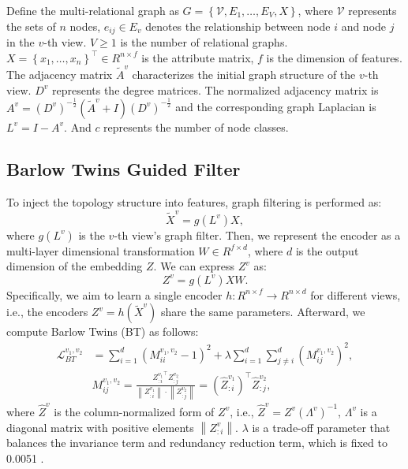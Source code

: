 \documentclass[letterpaper]{article} %
\begin{document}
Define the multi-relational graph as $G=\left\{\mathcal{V}, E_1, \ldots, E_{V}, X\right\}$, where $\mathcal{V}$ represents the sets of $n$ nodes, $e_{i j} \in E_v$ denotes the relationship between node $i$ and node $j$ in the $v$-th view. ${V} \geq 1$ is the number of relational graphs. $X=\left\{x_1, \ldots, x_n\right\}^{\top} \in {R}^{n \times f}$ is the attribute matrix, $f$ is the dimension of features. The adjacency matrix $\widetilde{A}^v$ characterizes the initial graph structure of the $v$-th view. $D^v$ represents the degree matrices. The normalized adjacency matrix is $A^v=\left(D^v\right)^{-\frac{1}{2}}\left(\widetilde{A}^v+I\right)\left(D^v\right)^{-\frac{1}{2}}$ and the corresponding graph Laplacian is $L^v=I-A^v$. And $c$ represents the number of node classes.


\subsection{Barlow Twins Guided Filter}

To inject the topology structure into features, graph filtering is performed as:
\begin{equation}
    \widetilde{X}^{v} = g(L^{v}) X,
\end{equation}
where $g(L^v)$ is the $v$-th view's graph filter.
Then, we represent the encoder as a multi-layer dimensional transformation $W \in R^{f\times d}$, where $d$ is the output dimension of the embedding $Z$. We can express $Z^{v}$ as:
\begin{equation}\label{embedding}
    Z^{v} = g(L^{v}) X W.
\end{equation}
Specifically, we aim to learn a single encoder $h: R^{n\times f} \to R^{n\times d}$ for different views, i.e., the encoders $Z^v = h(\widetilde{X}^v)$  share the same parameters.
Afterward, we compute Barlow Twins (BT) as follows:
\begin{equation}
\begin{aligned}\label{barlowtwins1}
    \mathcal{L}^{v_1,v_2}_{BT} &=\sum_{i=1}^{d}\left(M^{v_1,v_2}_{i i}-1\right)^{2}+\lambda \sum_{i=1}^{d} \sum_{j \neq i}^d (M^{v_1,v_2}_{i j})^{2}, \\
    &M^{v_1,v_2}_{i j} = \frac{{Z^{v_1}_{:i}}^{\top} Z^{v_2}_{:j}}{\left\|Z^{v_1}_{:i}\right\| \cdot\left\|Z^{v_2}_{:j}\right\|} = (\hat{Z}^{v_1}_{:i})^{\top} \hat{Z}^{v_2}_{:j},
\end{aligned}
\end{equation}  
where  $\hat{Z}^{v}$ is the column-normalized form of $Z^{v}$, i.e., $\hat{Z}^{v} = Z^{v}(\Lambda^{v})^{-1}$, $\Lambda^{v}$ is a diagonal matrix with positive elements $\left\|Z^{v}_{:i}\right\|$. $\lambda$ is a trade-off parameter that balances the invariance term and redundancy reduction term, which is fixed to 0.0051 \cite{zbontar2021barlow}.
\end{document}
